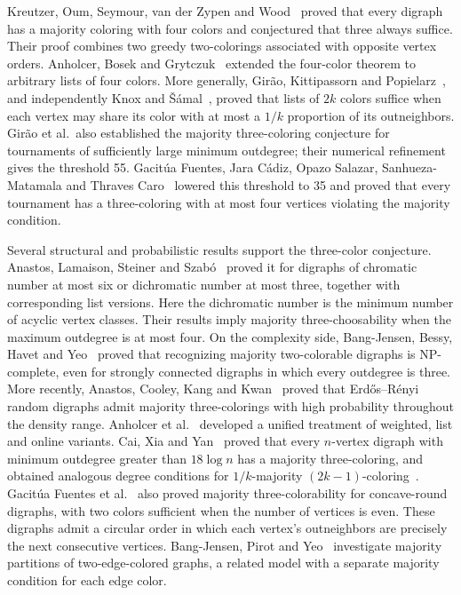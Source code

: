 \documentclass[10pt,a4paper]{article}
\begin{document}
Kreutzer, Oum, Seymour, van der Zypen and Wood~\cite{KOSZW} proved that every digraph has a majority coloring with four colors and conjectured that three always suffice. Their proof combines two greedy two-colorings associated with opposite vertex orders. Anholcer, Bosek and Grytczuk~\cite{ABG} extended the four-color theorem to arbitrary lists of four colors. More generally, Gir\~ao, Kittipassorn and Popielarz~\cite{GKP}, and independently Knox and \v{S}\'amal~\cite{KS}, proved that lists of \(2k\) colors suffice when each vertex may share its color with at most a \(1/k\) proportion of its outneighbors. Gir\~ao et al.\ also established the majority three-coloring conjecture for tournaments of sufficiently large minimum outdegree; their numerical refinement gives the threshold 55. Gacit\'ua Fuentes, Jara C\'adiz, Opazo Salazar, Sanhueza-Matamala and Thraves Caro~\cite[Theorems~1.7--1.8]{GJOST} lowered this threshold to 35 and proved that every tournament has a three-coloring with at most four vertices violating the majority condition.

Several structural and probabilistic results support the three-color conjecture. Anastos, Lamaison, Steiner and Szab\'o~\cite{ALSS} proved it for digraphs of chromatic number at most six or dichromatic number at most three, together with corresponding list versions. Here the dichromatic number is the minimum number of acyclic vertex classes. Their results imply majority three-choosability when the maximum outdegree is at most four. On the complexity side, Bang-Jensen, Bessy, Havet and Yeo~\cite{BBHY} proved that recognizing majority two-colorable digraphs is NP-complete, even for strongly connected digraphs in which every outdegree is three. More recently, Anastos, Cooley, Kang and Kwan~\cite{ACKK} proved that Erd\H{o}s--R\'enyi random digraphs admit majority three-colorings with high probability throughout the density range. Anholcer et al.~\cite{MrsCorrect} developed a unified treatment of weighted, list and online variants. Cai, Xia and Yan~\cite[Theorem~3.1]{CXY} proved that every \(n\)-vertex digraph with minimum outdegree greater than \(18\log n\) has a majority three-coloring, and obtained analogous degree conditions for \(1/k\)-majority \((2k-1)\)-coloring~\cite[Theorem~3.2]{CXY}. Gacit\'ua Fuentes et al.~\cite[Theorems~2.1--2.2]{GJOST} also proved majority three-colorability for concave-round digraphs, with two colors sufficient when the number of vertices is even. These digraphs admit a circular order in which each vertex's outneighbors are precisely the next consecutive vertices. Bang-Jensen, Pirot and Yeo~\cite{BPY} investigate majority partitions of two-edge-colored graphs, a related model with a separate majority condition for each edge color.
\end{document}
